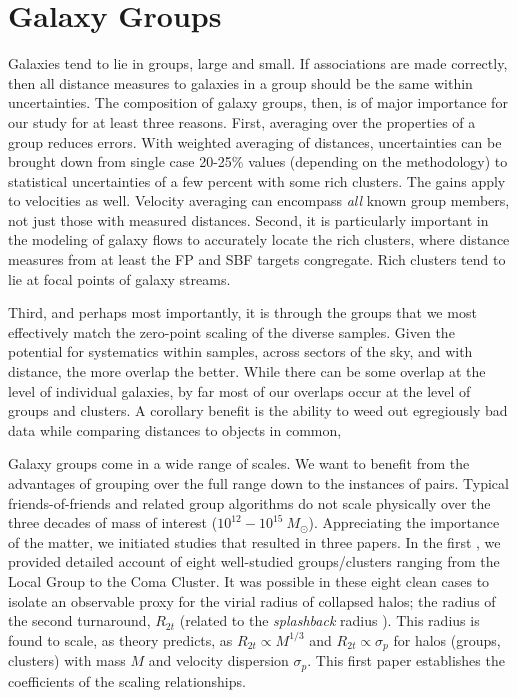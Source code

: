 \documentclass[twocolumn]{aastex63}
\newcommand{\Msun}{M_{\odot}}
\begin{document}
\section{Galaxy Groups}
\label{sec:groups}

Galaxies tend to lie in groups, large and small.  If associations are made correctly, then all distance measures to galaxies in a group should be the same within uncertainties.  The composition of galaxy groups, then, is of major importance for our study for at least three reasons.  First, averaging over the properties of a group reduces errors.  With weighted averaging of distances, uncertainties can be brought down from single case 20-25\% values (depending on the methodology) to statistical uncertainties of a few percent with some rich clusters.  The gains apply to velocities as well.  Velocity averaging can encompass {\it all} known group members, not just those with measured distances.  Second, it is particularly important in the modeling of galaxy flows to accurately locate the rich clusters, where distance measures from at least the FP and SBF targets congregate.  Rich clusters tend to lie at focal points of galaxy streams.

Third, and perhaps most importantly, it is through the groups that we most effectively match the zero-point scaling of the diverse samples.  Given the potential for systematics within samples, across sectors of the sky, and with distance, the more overlap the better.  While there can be some overlap at the level of individual galaxies, by far most of our overlaps occur at the level of groups and clusters.  A corollary benefit is the ability to weed out egregiously bad data while comparing distances to objects in common, 

Galaxy groups come in a wide range of scales.  We want to benefit from the advantages of grouping over the full range down to the instances of pairs.  Typical friends-of-friends and related group algorithms do not scale physically over the three decades of mass of interest ($10^{12} - 10^{15}~\Msun$).  Appreciating the importance of the matter, we initiated studies that resulted in three papers.  In the first \citep{2015AJ....149...54T}, we  provided detailed account of eight well-studied groups/clusters ranging from the Local Group to the Coma Cluster.  It was possible in these eight clean cases to isolate an observable proxy for the virial radius of collapsed halos; the radius of the second turnaround, $R_{2t}$ (related to the {\it splashback} radius \citep{2014JCAP...11..019A}).  This radius is found to scale, as theory predicts, as $R_{2t} \propto M^{1/3}$ and $R_{2t} \propto \sigma_p$ for halos (groups, clusters) with mass $M$ and velocity dispersion $\sigma_p$.  This first paper establishes the coefficients of the scaling relationships.
\end{document}
